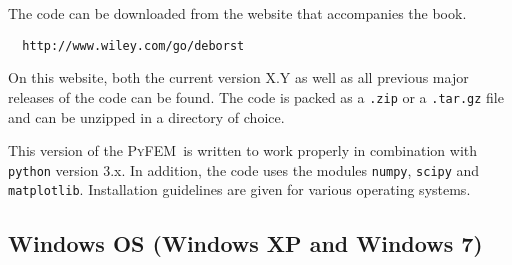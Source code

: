 \documentclass{article}
\newcommand{\progname}{\textsc{PyFEM}}
\begin{document}
The code can be downloaded from the website that accompanies the book.

\begin{verbatim}
  http://www.wiley.com/go/deborst
\end{verbatim}
\noindent
On this website, both the current version X.Y as well as all previous major releases of the code
can be found. The code is packed as a \texttt{.zip} or a \texttt{.tar.gz} file and 
can be unzipped in a directory of choice. 

This version of the \progname~is written to work properly in combination with 
\texttt{python} version 3.x. In addition, the code uses the modules \texttt{numpy}, \texttt{scipy} and
\texttt{matplotlib}. Installation guidelines are given for various operating systems.

\subsection{Windows OS (Windows XP and Windows 7)}
\end{document}

